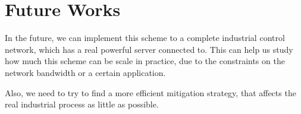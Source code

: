 
\section{Future Works}

In the future, we can implement this scheme to a complete industrial control network, which has a real powerful server connected to. This can help us study how much this scheme can be scale in practice, due to the constraints on the network bandwidth or a certain application. 

Also, we need to try to find a more efficient mitigation strategy, that affects the real industrial process as little as possible.  